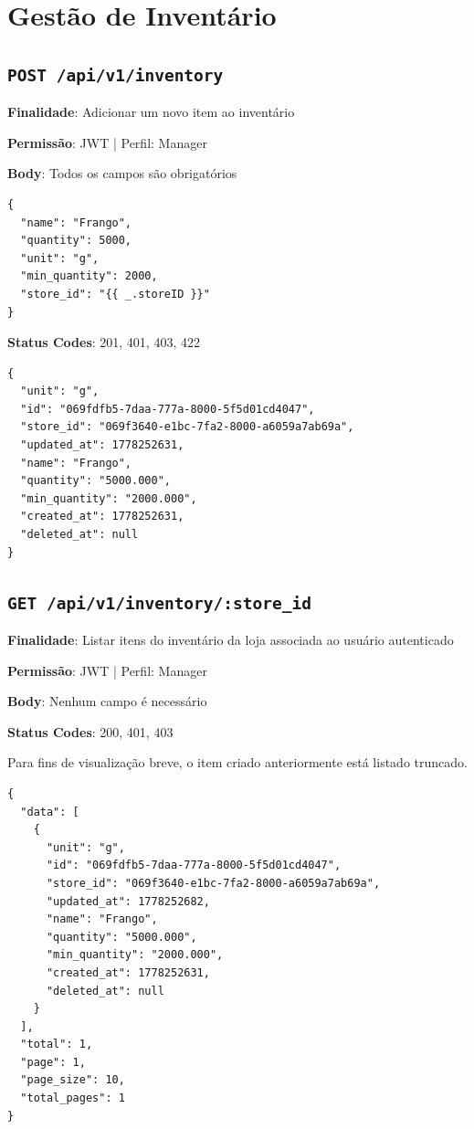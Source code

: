 \section{Gestão de Inventário}

\subsection{\texttt{POST /api/v1/inventory}}

\noindent\textbf{Finalidade}: Adicionar um novo item ao inventário

\noindent\textbf{Permissão}: JWT | Perfil: Manager

\noindent\textbf{Body}: Todos os campos são obrigatórios

\vspace{-0.2cm}

\begin{verbatim}
{
  "name": "Frango",
  "quantity": 5000,
  "unit": "g",
  "min_quantity": 2000,
  "store_id": "{{ _.storeID }}"
}
\end{verbatim}

\noindent\textbf{Status Codes}: 201, 401, 403, 422

\begin{tcolorbox}[colback=green!5, colframe=black, title=\textbf{201 Created}]
\begin{verbatim}
{
  "unit": "g",
  "id": "069fdfb5-7daa-777a-8000-5f5d01cd4047",
  "store_id": "069f3640-e1bc-7fa2-8000-a6059a7ab69a",
  "updated_at": 1778252631,
  "name": "Frango",
  "quantity": "5000.000",
  "min_quantity": "2000.000",
  "created_at": 1778252631,
  "deleted_at": null
}
\end{verbatim}
\end{tcolorbox}

\subsection{\texttt{GET /api/v1/inventory/:store\_id}}

\noindent\textbf{Finalidade}: Listar itens do inventário da loja associada ao usuário autenticado

\noindent\textbf{Permissão}: JWT | Perfil: Manager

\noindent\textbf{Body}: Nenhum campo é necessário

\noindent\textbf{Status Codes}: 200, 401, 403

\begin{tcolorbox}[colback=green!5, colframe=black, title=\textbf{200 OK}]
Para fins de visualização breve, o item criado anteriormente está listado truncado.
\begin{verbatim}
{
  "data": [
    {
      "unit": "g",
      "id": "069fdfb5-7daa-777a-8000-5f5d01cd4047",
      "store_id": "069f3640-e1bc-7fa2-8000-a6059a7ab69a",
      "updated_at": 1778252682,
      "name": "Frango",
      "quantity": "5000.000",
      "min_quantity": "2000.000",
      "created_at": 1778252631,
      "deleted_at": null
    }
  ],
  "total": 1,
  "page": 1,
  "page_size": 10,
  "total_pages": 1
}
\end{verbatim}
\end{tcolorbox}

